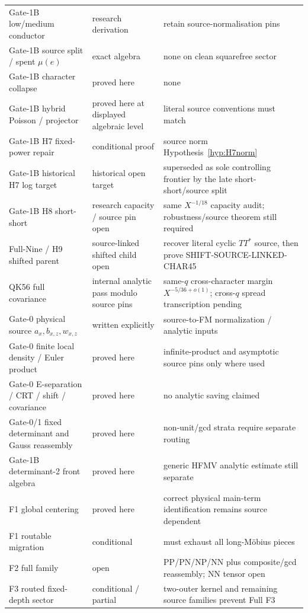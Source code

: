 \documentclass[11pt]{article}
\theoremstyle{definition}
\theoremstyle{remark}
\newcommand{\1}{\mathbf 1}
\begin{document}
\begin{longtable}{p{}p{}p{}}
Gate-1B low/medium conductor & research derivation & retain source-normalisation pins\\
Gate-1B source split / spent $\mu(e)$ & exact algebra & none on clean squarefree sector\\
Gate-1B character collapse & proved here & none\\
Gate-1B hybrid Poisson / projector & proved here at displayed algebraic level & literal source conventions must match\\
Gate-1B H7 fixed-power repair & conditional proof & source norm Hypothesis~\ref{hyp:H7norm}\\
Gate-1B historical H7 log target & historical open target & superseded as sole controlling frontier by the late short-short/source split\\
Gate-1B H8 short-short & research capacity / source pin open & same $X^{-1/18}$ capacity audit; robustness/source theorem still required\\
Full-Nine / H9 shifted parent & source-linked shifted child open & recover literal cyclic $TT^*$ source, then prove SHIFT-SOURCE-LINKED-CHAR45\\
QK56 full covariance & internal analytic pass modulo source pins & same-$q$ cross-character margin $X^{-5/36+o(1)}$; cross-$q$ spread transcription pending\\
Gate-0 physical source $a_x,b_{x,z},w_{x,z}$ & written explicitly & source-to-FM normalization / analytic inputs\\
Gate-0 finite local density / Euler product & proved here & infinite-product and asymptotic source pins only where used\\
Gate-0 E-separation / CRT / shift / covariance & proved here & no analytic saving claimed\\
Gate-0/1 fixed determinant and Gauss reassembly & proved here & non-unit/gcd strata require separate routing\\
Gate-1B determinant-2 front algebra & proved here & generic HFMV analytic estimate still separate\\
F1 global centering & proved here & correct physical main-term identification remains source dependent\\
F1 routable migration & conditional & must exhaust all long-M\"obius pieces\\
F2 full family & open & PP/PN/NP/NN plus composite/gcd reassembly; NN tensor open\\
F3 routed fixed-depth sector & conditional / partial & two-outer kernel and remaining source families prevent Full F3\\

\end{longtable}
\end{document}
